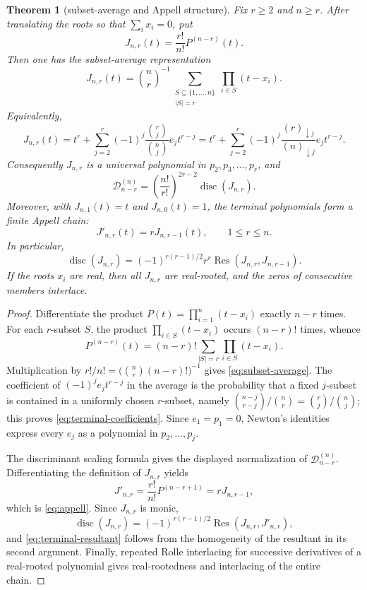 \documentclass[10pt,a4paper]{amsart}
\numberwithin{equation}{section}
\newtheorem{theorem}{Theorem}
\newcommand{\D}{\mathcal D}
\newcommand{\Res}{\operatorname{Res}}
\newcommand{\disc}{\operatorname{disc}}
\begin{document}
\begin{theorem}[subset-average and Appell structure]\label{thm:terminal-normalized}
Fix $r\ge2$ and $n\ge r$.  After translating the roots so that
$\sum_i x_i=0$, put
\[
J_{n,r}(t)=\frac{r!}{n!}P^{(n-r)}(t).
\]
Then one has the subset-average representation
\begin{equation}\label{eq:subset-average}
J_{n,r}(t)=\binom nr^{-1}
\sum_{\substack{S\subseteq\{1,\ldots,n\}\\ |S|=r}}
\prod_{i\in S}(t-x_i).
\end{equation}
Equivalently,
\begin{equation}\label{eq:terminal-coefficients}
J_{n,r}(t)
=t^r+\sum_{j=2}^r(-1)^j
\frac{\binom rj}{\binom nj}e_jt^{r-j}
=t^r+\sum_{j=2}^r(-1)^j
\frac{(r)_{\downarrow j}}{(n)_{\downarrow j}}e_jt^{r-j}.
\end{equation}
Consequently $J_{n,r}$ is a universal polynomial in
$p_2,p_3,\ldots,p_r$, and
\[
\D_{n-r}^{(n)}=\left(\frac{n!}{r!}\right)^{2r-2}
\disc(J_{n,r}).
\]
Moreover, with $J_{n,1}(t)=t$ and $J_{n,0}(t)=1$, the terminal polynomials
form a finite Appell chain:
\begin{equation}\label{eq:appell}
J'_{n,r}(t)=rJ_{n,r-1}(t),\qquad 1\le r\le n.
\end{equation}
In particular,
\begin{equation}\label{eq:terminal-resultant}
\disc(J_{n,r})
=(-1)^{r(r-1)/2}r^r\Res(J_{n,r},J_{n,r-1}).
\end{equation}
If the roots $x_i$ are real, then all $J_{n,r}$ are real-rooted, and the
zeros of consecutive members interlace.
\end{theorem}

\begin{proof}
Differentiate the product $P(t)=\prod_{i=1}^n(t-x_i)$ exactly $n-r$
times.  For each $r$-subset $S$, the product
$\prod_{i\in S}(t-x_i)$ occurs $(n-r)!$ times, whence
\[
P^{(n-r)}(t)=(n-r)!\sum_{|S|=r}\prod_{i\in S}(t-x_i).
\]
Multiplication by $r!/n!=\bigl(\binom nr(n-r)!\bigr)^{-1}$ gives
\eqref{eq:subset-average}.  The coefficient of $(-1)^je_jt^{r-j}$ in
the average is the probability that a fixed $j$-subset is contained in a
uniformly chosen $r$-subset, namely
$\binom{n-j}{r-j}/\binom nr=\binom rj/\binom nj$; this proves
\eqref{eq:terminal-coefficients}.  Since $e_1=p_1=0$, Newton's identities
express every $e_j$ as a polynomial in $p_2,\ldots,p_j$.

The discriminant scaling formula gives the displayed normalization of
$\D_{n-r}^{(n)}$.  Differentiating the definition of $J_{n,r}$ yields
\[
J'_{n,r}=\frac{r!}{n!}P^{(n-r+1)}=rJ_{n,r-1},
\]
which is \eqref{eq:appell}.  Since $J_{n,r}$ is monic,
\[
\disc(J_{n,r})=(-1)^{r(r-1)/2}\Res(J_{n,r},J'_{n,r}),
\]
and \eqref{eq:terminal-resultant} follows from the homogeneity of the
resultant in its second argument.  Finally, repeated Rolle interlacing for
successive derivatives of a real-rooted polynomial gives real-rootedness and
interlacing of the entire chain.
\end{proof}
\end{document}
